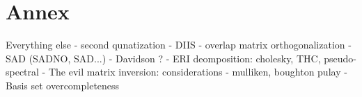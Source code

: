 \chapter{Annex}

Everything else
- second qunatization
- DIIS 
- overlap matrix orthogonalization
- SAD (SADNO, SAD...)
- Davidson ? 
- ERI deomposition: cholesky, THC, pseudo-spectral
- The evil matrix inversion: considerations
- mulliken, boughton pulay
- Basis set overcompleteness